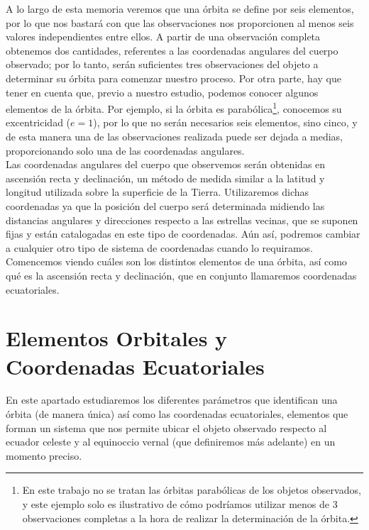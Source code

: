 \documentclass[11pt]{book}
\begin{document}
A lo largo de esta memoria veremos que una órbita se define por seis elementos, por lo que nos bastará con que las observaciones nos proporcionen al menos seis valores independientes entre ellos. A partir de una observación completa obtenemos dos cantidades, referentes a las coordenadas angulares del cuerpo observado; por lo tanto, serán suficientes tres observaciones del objeto a determinar su órbita para comenzar nuestro proceso. Por otra parte, hay que tener en cuenta que, previo a nuestro estudio, podemos conocer algunos elementos de la órbita. Por ejemplo, si la órbita es parabólica\footnote{En este trabajo no se tratan las órbitas parabólicas de los objetos observados, y este ejemplo solo es ilustrativo de cómo podríamos utilizar menos de 3 observaciones completas a la hora de realizar la determinación de la órbita.}, conocemos su excentricidad ($e=1$), por lo que no serán necesarios seis elementos, sino cinco, y de esta manera una de las observaciones realizada puede ser dejada a medias, proporcionando solo una de las coordenadas angulares.\\

Las coordenadas angulares del cuerpo que observemos serán obtenidas en ascensión recta y declinación, un método de medida similar a la latitud y longitud utilizada sobre la superficie de la Tierra. Utilizaremos dichas coordenadas ya que la posición del cuerpo será determinada midiendo las distancias angulares y direcciones respecto a las estrellas vecinas, que se suponen fijas y están catalogadas en este tipo de coordenadas. Aún así, podremos cambiar a cualquier otro tipo de sistema de coordenadas cuando lo requiramos.\\

Comencemos viendo cuáles son los distintos elementos de una órbita, así como qué es la ascensión recta y declinación, que en conjunto llamaremos coordenadas ecuatoriales.\\





\section{Elementos Orbitales y Coordenadas Ecuatoriales}
\label{sec:orbital_elements_equatorial_coordinates}
En este apartado estudiaremos los diferentes parámetros que identifican una órbita (de manera única) así como las coordenadas ecuatoriales, elementos que forman un sistema que nos permite ubicar el objeto observado respecto al ecuador celeste y al equinoccio vernal (que definiremos más adelante) en un momento preciso.\\
\end{document}
